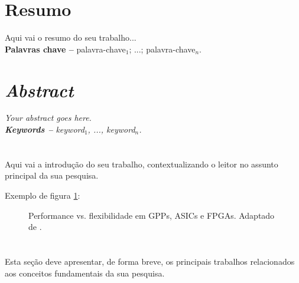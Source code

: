 \documentclass[12pt,a4paper]{article}
\begin{document}
\makeourtitle

\tableofcontents

\newpage
\section*{Resumo}
\label{sec:resumo}
Aqui vai o resumo do seu trabalho...\\%


\textbf{Palavras chave --} palavra-chave$_1$; ...; palavra-chave$_n$.


\newpage
\section*{\textit{Abstract}}
\label{sec:abstract}
\textit{
  Your abstract goes here.
}\\%

\textit{\textbf{Keywords --} keyword$_1$, ..., keyword$_n$.}


\newpage
\section{\sectionI}
\label{sec:introducao}
Aqui vai a introdução do seu trabalho, contextualizando o leitor no assunto principal da sua pesquisa.

Exemplo de figura \ref{fig:perf_flex}:

\begin{figure}[ht]
	\centering
	\caption{Performance vs. flexibilidade em GPPs, ASICs e FPGAs.
	  Adaptado de \cite{Bobda2007a}.}
	\label{fig:perf_flex}
\end{figure}


\section{\sectionII}
\label{sec:trabalhos-relacionados}
Esta seção deve apresentar, de forma breve, os principais trabalhos relacionados aos conceitos fundamentais da sua pesquisa.
\end{document}
